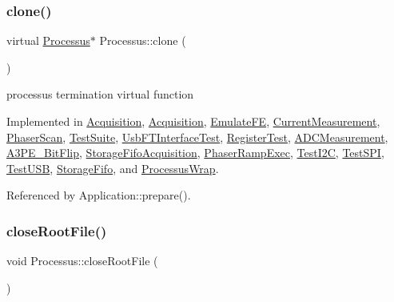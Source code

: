 \subsubsection{\texorpdfstring{clone()}{clone()}}
{\footnotesize\ttfamily virtual \hyperlink{classProcessus}{Processus}$\ast$ Processus\+::clone (\begin{DoxyParamCaption}{ }\end{DoxyParamCaption})\hspace{0.3cm}{\ttfamily [pure virtual]}}

processus termination virtual function 

Implemented in \hyperlink{classAcquisition_a4b1b690ef27f20b3e1ad9383f2f57628}{Acquisition}, \hyperlink{classAcquisition_a4b1b690ef27f20b3e1ad9383f2f57628}{Acquisition}, \hyperlink{classEmulateFE_a9a704d0081a275410d19071a006f1a80}{Emulate\+FE}, \hyperlink{classCurrentMeasurement_a7722435fcc404fe4761c3fa96f3b6338}{Current\+Measurement}, \hyperlink{classPhaserScan_a4c842f4bda17fb8907c51efc0ccb9d43}{Phaser\+Scan}, \hyperlink{classTestSuite_a949558c82561fd2b3548f0d050accab8}{Test\+Suite}, \hyperlink{classUsbFTInterfaceTest_af4eae62d10c30e060d19aa48621ffb54}{Usb\+F\+T\+Interface\+Test}, \hyperlink{classRegisterTest_a05c7318198562df874c8d7ab5d0e9f89}{Register\+Test}, \hyperlink{classADCMeasurement_a6e34c2b4e3451f1fd128d213723ab1b9}{A\+D\+C\+Measurement}, \hyperlink{classA3PE__BitFlip_a444f2b4fd5211e457105f13d19795211}{A3\+P\+E\+\_\+\+Bit\+Flip}, \hyperlink{classStorageFifoAcquisition_aab797010fd3efe7ef2c4a6e6ba4e87c2}{Storage\+Fifo\+Acquisition}, \hyperlink{classPhaserRampExec_a2586b2209d381c5b82a13dc2f997925f}{Phaser\+Ramp\+Exec}, \hyperlink{classTestI2C_a52b8f5f8203ebea02d0cd73be029de23}{Test\+I2C}, \hyperlink{classTestSPI_afbca7dd9802d226ee1fec8475ff5f127}{Test\+S\+PI}, \hyperlink{classTestUSB_a109094c177ccaaa224b514c118c93ce7}{Test\+U\+SB}, \hyperlink{classStorageFifo_a80b534eb6d81a3b570f6957d6a932987}{Storage\+Fifo}, and \hyperlink{structProcessusWrap_a6582297a477b1cd1594f90a80691fca3}{Processus\+Wrap}.



Referenced by Application\+::prepare().

\mbox{\label{classProcessus_a2f3c41e99da4c738ea3d8f7b0d20a665}} 
\subsubsection{\texorpdfstring{close\+Root\+File()}{closeRootFile()}}
{\footnotesize\ttfamily void Processus\+::close\+Root\+File (\begin{DoxyParamCaption}{ }\end{DoxyParamCaption})}

